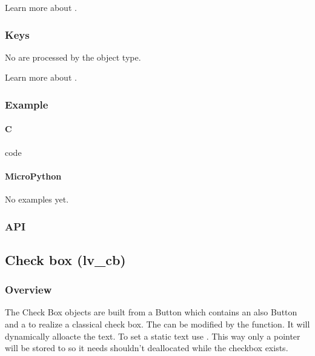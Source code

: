 \documentclass[letterpaper,10pt,english]{sphinxmanual}
\begin{document}
Learn more about {\hyperref[\detokenize{overview/events::doc}]{}}.


\subsubsection{Keys}
\label{\detokenize{object-types/canvas:keys}}
No  are processed by the object type.

Learn more about {\hyperref[\detokenize{overview/indev::doc}]{}}.


\subsubsection{Example}
\label{\detokenize{object-types/canvas:example}}

\paragraph{C}
\label{\detokenize{object-types/canvas:c}}
code

\begin{sphinxVerbatim}[commandchars=\\\{\}]

\end{sphinxVerbatim}


\paragraph{MicroPython}
\label{\detokenize{object-types/canvas:micropython}}
No examples yet.


\subsubsection{API}
\label{\detokenize{object-types/canvas:api}}

\subsection{Check box (lv\_cb)}
\label{\detokenize{object-types/cb:check-box-lv-cb}}\label{\detokenize{object-types/cb::doc}}

\subsubsection{Overview}
\label{\detokenize{object-types/cb:overview}}
The Check Box objects are built from a Button  which contains an also Button  and a  to realize a classical check box.
The  can be modified by the  function. It will dynamically alloacte the text.
To set a static text use . This way only a pointer will be stored to  so it needs shouldn’t deallocated while the checkbox exists.
\end{document}
